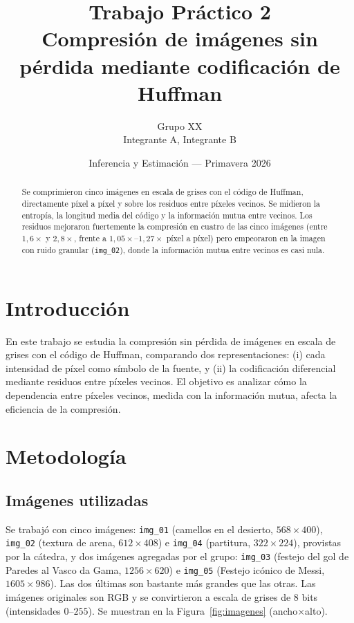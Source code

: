 \documentclass[11pt,a4paper]{article}
\title{Trabajo Práctico 2\\[2pt]\large Compresión de imágenes sin pérdida mediante codificación de Huffman}
\author{Grupo XX \\ Integrante A, Integrante B}
\date{Inferencia y Estimación --- Primavera 2026}
\begin{document}
\maketitle

\begin{abstract}
Se comprimieron cinco imágenes en escala de grises con el código de Huffman, directamente píxel a píxel y sobre los residuos entre píxeles vecinos. Se midieron la entropía, la longitud media del código y la información mutua entre vecinos. Los residuos mejoraron fuertemente la compresión en cuatro de las cinco imágenes (entre $1{,}6\times$ y $2{,}8\times$, frente a $1{,}05\times$--$1{,}27\times$ píxel a píxel) pero empeoraron en la imagen con ruido granular (\texttt{img\_02}), donde la información mutua entre vecinos es casi nula.
\end{abstract}

\section{Introducción}
En este trabajo se estudia la compresión sin pérdida de imágenes en escala de grises con el código de Huffman, comparando dos representaciones: (i) cada intensidad de píxel como símbolo de la fuente, y (ii) la codificación diferencial mediante residuos entre píxeles vecinos. El objetivo es analizar cómo la dependencia entre píxeles vecinos, medida con la información mutua, afecta la eficiencia de la compresión.

\section{Metodología}
\subsection{Imágenes utilizadas}
Se trabajó con cinco imágenes: \texttt{img\_01} (camellos en el desierto, $568\times400$), \texttt{img\_02} (textura de arena, $612\times408$) e \texttt{img\_04} (partitura, $322\times224$), provistas por la cátedra, y dos imágenes agregadas por el grupo: \texttt{img\_03} (festejo del gol de Paredes al Vasco da Gama, $1256\times620$) e \texttt{img\_05} (Festejo icónico de Messi, $1605\times986$). Las dos últimas son bastante más grandes que las otras. Las imágenes originales son RGB y se convirtieron a escala de grises de 8 bits (intensidades $0$--$255$). Se muestran en la Figura~\ref{fig:imagenes} (ancho$\times$alto).
\end{document}
